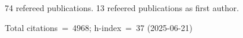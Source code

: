 74 refereed publications. 13 refeered publications as first author.

Total citations~=~4968; h-index~=~37 (2025-06-21)